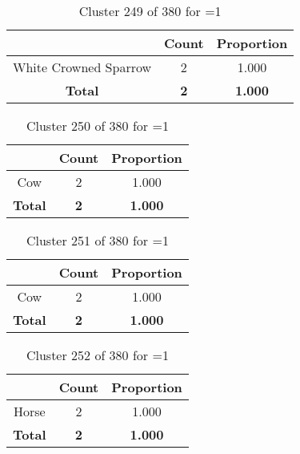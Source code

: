 \begin{table}[ht!]
\centering
\begin{tabular}{|c|c|c|}
\hline
\bf \Spec{} &\bf Count &\bf Proportion\\ \hline \hline
White Crowned Sparrow & 2 & 1.000\\ \hline
\hline
\bf Total & \bf 2 & \bf 1.000\\ \hline
\end{tabular}
\label{tab:cluster:249:1}
\caption{Cluster 249 of 380 for \minneigh{}=1}
\end{table}

\clearpage
\begin{table}[ht!]
\centering
\begin{tabular}{|c|c|c|}
\hline
\bf \Spec{} &\bf Count &\bf Proportion\\ \hline \hline
Cow & 2 & 1.000\\ \hline
\hline
\bf Total & \bf 2 & \bf 1.000\\ \hline
\end{tabular}
\label{tab:cluster:250:1}
\caption{Cluster 250 of 380 for \minneigh{}=1}
\end{table}

\begin{table}[ht!]
\centering
\begin{tabular}{|c|c|c|}
\hline
\bf \Spec{} &\bf Count &\bf Proportion\\ \hline \hline
Cow & 2 & 1.000\\ \hline
\hline
\bf Total & \bf 2 & \bf 1.000\\ \hline
\end{tabular}
\label{tab:cluster:251:1}
\caption{Cluster 251 of 380 for \minneigh{}=1}
\end{table}

\begin{table}[ht!]
\centering
\begin{tabular}{|c|c|c|}
\hline
\bf \Spec{} &\bf Count &\bf Proportion\\ \hline \hline
Horse & 2 & 1.000\\ \hline
\hline
\bf Total & \bf 2 & \bf 1.000\\ \hline
\end{tabular}
\label{tab:cluster:252:1}
\caption{Cluster 252 of 380 for \minneigh{}=1}
\end{table}

